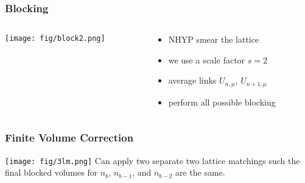 \documentclass{beamer}
\begin{document}
  \begin{frame}
    \addtocounter{framenumber}{-1}
    \frametitle{Blocking}
    \begin{columns}[T]
      \begin{column}{.5\textwidth}
        \begin{block}{}
          \texttt{[image: fig/block2.png]}
        \end{block}
      \end{column}
      \begin{column}{.5\textwidth}
        \begin{block}{}
          \begin{itemize}
            \item NHYP smear the lattice
            \item we use a scale factor $s=2$
            \item average links $U_{n,\mu}$, $U_{n+1,\mu}$
            \item perform all possible blocking
          \end{itemize}
        \end{block}
      \end{column}
    \end{columns}
  \end{frame}

  \begin{frame}
    \addtocounter{framenumber}{-1}
    \frametitle{Finite Volume Correction}
    \centering
    \texttt{[image: fig/3lm.png]}
    \vspace{12pt}
    Can apply two separate two lattice matchings such the final blocked volumes for $n_b$, $n_{b-1}$, and $n_{b-2}$ are the same.
  \end{frame}
\end{document}
